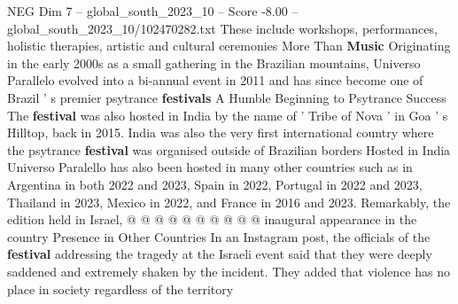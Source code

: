 \begin{textsample}{NEG Dim 7 – global\_south\_2023\_10 – Score -8.00 – global\_south\_2023\_10/102470282.txt}
These include workshops, performances, holistic therapies, artistic and cultural ceremonies More Than \textbf{Music} Originating in the early 2000s as a small gathering in the Brazilian mountains, Universo Parallelo evolved into a bi-annual event in 2011 and has since become one of Brazil ' s premier psytrance \textbf{festivals} A Humble Beginning to Psytrance Success The \textbf{festival} was also hosted in India by the name of ' Tribe of Nova ' in Goa ' s Hilltop, back in 2015.
India was also the very first international country where the psytrance \textbf{festival} was organised outside of Brazilian borders Hosted in India Universo Paralello has also been hosted in many other countries such as in Argentina in both 2022 and 2023, Spain in 2022, Portugal in 2022 and 2023, Thailand in 2023, Mexico in 2022, and France in 2016 and 2023.
Remarkably, the edition held in Israel, @ @ @ @ @ @ @ @ @ @ inaugural appearance in the country Presence in Other Countries In an Instagram post, the officials of the \textbf{festival} addressing the tragedy at the Israeli event said that they were deeply saddened and extremely shaken by the incident.
They added that violence has no place in society regardless of the territory

\end{textsample}
